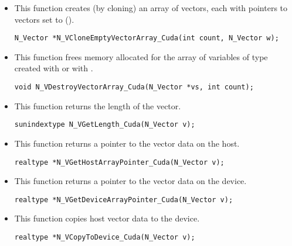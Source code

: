 \begin{itemize}
\item {}
 
  This function creates (by cloning) an array of  {\nveccuda} vectors,
  each with pointers to {\cuda} vectors set to ().
 
\begin{verbatim}
N_Vector *N_VCloneEmptyVectorArray_Cuda(int count, N_Vector w);
\end{verbatim}


\item {}
 
 This function frees memory allocated for the array of  variables of
 type  created with  or with
 .
 

 \verb|void N_VDestroyVectorArray_Cuda(N_Vector *vs, int count);|


\item {}
 
 This function returns the length of the vector.

 \verb|sunindextype N_VGetLength_Cuda(N_Vector v);|


\item {}
 
 This function returns a pointer to the vector data on the host.

 \verb|realtype *N_VGetHostArrayPointer_Cuda(N_Vector v);|



\item {}
 
 This function returns a pointer to the vector data on the device.

 \verb|realtype *N_VGetDeviceArrayPointer_Cuda(N_Vector v);|



\item {}
 
 This function copies host vector data to the device.

 \verb|realtype *N_VCopyToDevice_Cuda(N_Vector v);|



\end{itemize}

